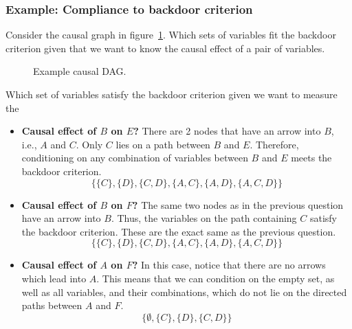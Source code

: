 \documentclass{article}
\begin{document}
\subsubsection{Example: Compliance to backdoor criterion}

Consider the causal graph in figure~\ref{fig:bdex}. Which sets of variables fit the backdoor criterion given that we want to know the causal effect of a pair of variables. 

\begin{figure}[H]
    \centering
    
    \caption{Example causal DAG.}
    \label{fig:bdex}
\end{figure}

\noindent Which set of variables satisfy the backdoor criterion given we want to measure the
\begin{itemize}
    \item \textbf{Causal effect of $B$ on $E$?} There are 2 nodes that have an arrow into $B$, i.e., $A$ and $C$. Only $C$ lies on a path between $B$ and $E$. Therefore, conditioning on any combination of variables between $B$ and $E$ meets the backdoor criterion. 
    $$
        \{ \{C\}, \{D\}, \{C, D\}, \{A, C\}, \{A, D\}, \{A, C, D\}\}
    $$
    \item \textbf{Causal effect of $B$ on $F$?} The same two nodes as in the previous question have an arrow into $B$. Thus, the variables on the path containing $C$ satisfy the backdoor criterion. These are the exact same as the previous question. 
    $$
        \{ \{C\}, \{D\}, \{C, D\}, \{A, C\}, \{A, D\}, \{A, C, D\}\}
    $$
    \item \textbf{Causal effect of $A$ on $F$?} In this case, notice that there are no arrows which lead into $A$. This means that we can condition on the empty set, as well as all variables, and their combinations, which do not lie on the directed paths between $A$ and $F$. 
    $$
        \{ \emptyset, \{C\}, \{D\}, \{C, D\}\}
    $$
\end{itemize}
\end{document}
